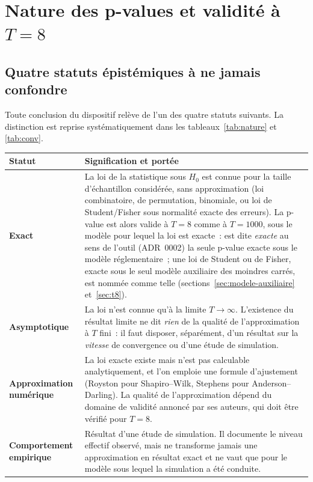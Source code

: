 \documentclass[a4paper,11pt]{article}
\begin{document}
\clearpage
\section{Nature des p-values et validité à $T = 8$}
\label{sec:nature}

\subsection{Quatre statuts épistémiques à ne jamais confondre}

Toute conclusion du dispositif relève de l'un des quatre statuts suivants. La
distinction est reprise systématiquement dans les tableaux~\ref{tab:nature} et
\ref{tab:conv}.

\begin{center}
\small
\begin{tabular}{@{}p{3.0cm}p{12.3cm}@{}}
\toprule
\textbf{Statut} & \textbf{Signification et portée} \\
\midrule
\textbf{Exact} & La loi de la statistique sous $H_0$ est connue pour la taille
d'échantillon considérée, sans approximation (loi combinatoire, de permutation,
binomiale, ou loi de Student/Fisher sous normalité exacte des erreurs). La
p-value est alors valide à $T = 8$ comme à $T = 1000$, sous le modèle pour lequel
la loi est exacte~: est dite \emph{exacte} au sens de l'outil (ADR~0002) la seule
p-value exacte sous le modèle réglementaire~; une loi de Student ou de Fisher,
exacte sous le seul modèle auxiliaire des moindres carrés, est nommée comme telle
(sections~\ref{sec:modele-auxiliaire} et~\ref{sec:t8}). \\
\textbf{Asymptotique} & La loi n'est connue qu'à la limite $T \to \infty$.
L'existence du résultat limite ne dit \emph{rien} de la qualité de
l'approximation à $T$ fini~: il faut disposer, séparément, d'un résultat sur la
\emph{vitesse} de convergence ou d'une étude de simulation. \\
\textbf{Approximation numérique} & La loi exacte existe mais n'est pas
calculable analytiquement, et l'on emploie une formule d'ajustement (Royston
pour Shapiro--Wilk, Stephens pour Anderson--Darling). La qualité de
l'approximation dépend du domaine de validité annoncé par ses auteurs, qui doit
être vérifié pour $T = 8$. \\
\textbf{Comportement empirique} & Résultat d'une étude de simulation. Il
documente le niveau effectif observé, mais ne transforme jamais une
approximation en résultat exact et ne vaut que pour le modèle sous lequel la
simulation a été conduite. \\
\bottomrule
\end{tabular}
\end{center}
\end{document}
